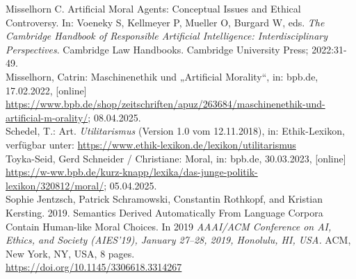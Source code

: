 Misselhorn C. Artificial Moral Agents:
Conceptual Issues and Ethical Controversy.
In: Voeneky S, Kellmeyer P, Mueller O, Burgard W, eds.
\textit{The Cambridge Handbook of Responsible Artificial Intelligence: Interdisciplinary Perspectives}.
Cambridge Law Handbooks.
Cambridge University Press; 2022:31-49. \\
\newline
Misselhorn, Catrin: Maschinenethik und „Artificial Morality“, in: bpb.de, 17.02.2022, [online]
\href{https://www.bpb.de/shop/zeitschriften/apuz/263684/maschinenethik-und-artificial-morality/}{https://www.bpb.de/shop/zeitschriften/apuz/263684/maschinenethik-und-artificial-m-orality/}; 08.04.2025.\\
\newline
Schedel, T.: Art.
\textit{Utilitarismus} (Version 1.0 vom 12.11.2018), in: Ethik-Lexikon, verfügbar
unter: \href{https://www.ethik-lexikon.de/lexikon/utilitarismus}{https://www.ethik-lexikon.de/lexikon/utilitarismus} \\
\newline
Toyka-Seid, Gerd Schneider / Christiane: Moral, in: bpb.de, 30.03.2023, [online]
\href{https://www.bpb.de/kurz-knapp/lexika/das-junge-politik-lexikon/320812/moral/}{https://w-ww.bpb.de/kurz-knapp/lexika/das-junge-politik-lexikon/320812/moral/}; 05.04.2025. \\
\newline
Sophie Jentzsch, Patrick Schramowski, Constantin Rothkopf, and Kristian
Kersting. 2019.
Semantics Derived Automatically From Language Corpora
Contain Human-like Moral Choices.
In 2019 \textit{AAAI/ACM Conference on AI,
Ethics, and Society (AIES’19), January 27–28, 2019, Honolulu, HI, USA.} ACM,
New York, NY, USA, 8 pages. \\
\href{https://doi.org/10.1145/3306618.3314267}{https://doi.org/10.1145/3306618.3314267} \\







